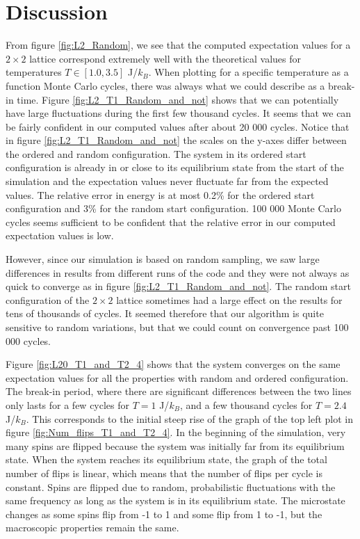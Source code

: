 \documentclass[reprint, english,notitlepage,nofootinbib]{revtex4-1}  %
\begin{document}
\section{Discussion}

From figure \ref{fig:L2_Random}, we see that the computed expectation values for a $2 \times 2$ lattice correspond extremely well with the theoretical values for temperatures $T \in [1.0, 3.5]$ J/$k_B$. When plotting for a specific temperature as a function Monte Carlo cycles, there was always what we could describe as a break-in time. Figure \ref{fig:L2_T1_Random_and_not} shows that we can potentially have large fluctuations during the first few thousand cycles. It seems that we can be fairly confident in our computed values after about 20 000 cycles. Notice that in figure \ref{fig:L2_T1_Random_and_not} the scales on the y-axes differ between the ordered and random configuration. The system in its ordered start configuration is already in or close to its equilibrium state from the start of the simulation and the expectation values never fluctuate far from the expected values. The relative error in energy is at most 0.2\% for the ordered start configuration and 3\% for the random start configuration. 100 000 Monte Carlo cycles seems sufficient to be confident that the relative error in our computed expectation values is low.

However, since our simulation is based on random sampling, we saw large differences in results from different runs of the code and they were not always as quick to converge as in figure \ref{fig:L2_T1_Random_and_not}. The random start configuration of the $2 \times 2$ lattice sometimes had a large effect on the results for tens of thousands of cycles. It seemed therefore that our algorithm is quite sensitive to random variations, but that we could count on convergence past 100 000 cycles.

Figure \ref{fig:L20_T1_and_T2_4} shows that the system converges on the same expectation values for all the properties with random and ordered configuration. The break-in period, where there are significant differences between the two lines only lasts for a few cycles for $T = 1$ J/$k_B$, and a few thousand cycles for $T = 2.4$ J/$k_B$. This corresponds to the initial steep rise of the graph of the top left plot in figure \ref{fig:Num_flips_T1_and_T2_4}. In the beginning of the simulation, very many spins are flipped because the system was initially far from its equilibrium state. When the system reaches its equilibrium state, the graph of the total number of flips is linear, which means that the number of flips per cycle is constant. Spins are flipped due to random, probabilistic fluctuations with the same frequency as long as the system is in its equilibrium state. The microstate changes as some spins flip from -1 to 1 and some flip from 1 to -1, but the macroscopic properties remain the same.
\end{document}
